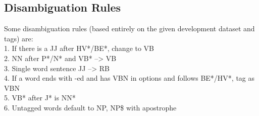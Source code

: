 \documentclass[11pt,a4paper,twocolumn]{article}
\begin{document}
	\subsection{Disambiguation Rules}
	Some disambiguation rules (based entirely on the given 
	development dataset and tags) are:\\
	1. If there is a JJ after HV*/BE*, change  to VB\\
	2. NN after P*/N* and VB* --> VB\\
	3. Single word sentence JJ --> RB\\
	4. If a word ends with -ed and has VBN in options and follows BE*/HV*, tag as VBN\\
	5. VB* after J* is NN*\\
	6. Untagged words default to NP, NP\$ with apostrophe\\
\end{document}
